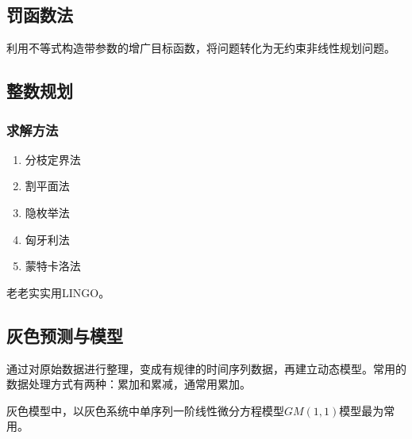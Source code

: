 \documentclass[12pt,a4paper]{article}
\begin{document}
\subsection*{罚函数法}
利用不等式构造带参数的增广目标函数，将问题转化为无约束非线性规划问题。

\subsection{整数规划}
\subsubsection{求解方法}
\begin{enumerate}
  \item 分枝定界法
  \item 割平面法
  \item 隐枚举法
  \item 匈牙利法
  \item 蒙特卡洛法
\end{enumerate}
老老实实用LINGO。

\subsection{灰色预测与模型}
通过对原始数据进行整理，变成有规律的时间序列数据，再建立动态模型。常用的数据处理方式有两种：累加和累减，通常用累加。

灰色模型中，以灰色系统中单序列一阶线性微分方程模型$GM(1,1)$模型最为常用。
\end{document}
